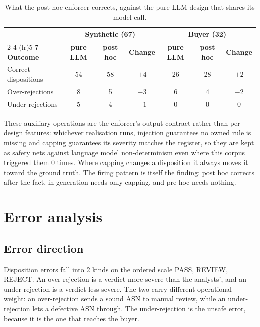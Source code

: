 \begin{table}[htb]
\centering
\caption{What the post hoc enforcer corrects, against the pure LLM design that shares its model call.}
\label{tab:results:flow}
\footnotesize
\begin{tabular}{@{}lcccccc@{}}
\toprule
& \multicolumn{3}{c}{\textbf{Synthetic (67)}} & \multicolumn{3}{c}{\textbf{Buyer (32)}} \\
\cmidrule(lr){2-4} \cmidrule(lr){5-7}
\textbf{Outcome} & \textbf{pure LLM} & \textbf{post hoc} & \textbf{Change} & \textbf{pure LLM} & \textbf{post hoc} & \textbf{Change} \\
\midrule
Correct dispositions & 54 & 58 & $+4$ & 26 & 28 & $+2$ \\
Over-rejections      & 8  & 5  & $-3$ & 6  & 4  & $-2$ \\
Under-rejections     & 5  & 4  & $-1$ & 0  & 0  & 0    \\
\bottomrule
\end{tabular}
\end{table}

These auxiliary operations are the enforcer's output contract rather than per-design features: whichever realisation runs, injection guarantees no owned rule is missing and capping guarantees its severity matches the register, so they are kept as safety nets against language model non-determinism even where this corpus triggered them 0 times. Where capping changes a disposition it always moves it toward the ground truth. The firing pattern is itself the finding: post hoc corrects after the fact, in generation needs only capping, and pre hoc needs nothing.


\section{Error analysis}
\label{sec:results:errors}

\subsection{Error direction}
\label{sec:results:direction}

Disposition errors fall into 2 kinds on the ordered scale PASS, REVIEW, REJECT. An over-rejection is a verdict more severe than the analysts', and an under-rejection is a verdict less severe. The two carry different operational weight: an over-rejection sends a sound ASN to manual review, while an under-rejection lets a defective ASN through. The under-rejection is the unsafe error, because it is the one that reaches the buyer.

